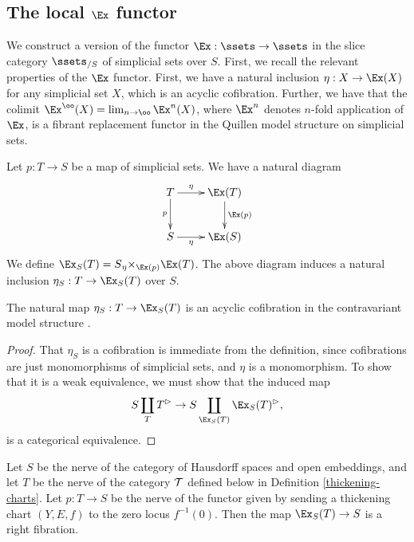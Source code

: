 \subsection{The local $\Ex$ functor}


We construct a version of the functor $\Ex: \ssets \to \ssets$ in the slice category $\ssets_{/S}$ of simplicial sets over $S$. First, we recall the relevant properties of the $\Ex$ functor. First, we have a natural inclusion $\eta: X \to \Ex(X)$ for any simplicial set $X$, which is an acyclic cofibration. Further, we have that the colimit $\Ex^\oo(X) = \lim_{n \to \oo} \Ex^n(X)$, where $\Ex^n$ denotes $n$-fold application of $\Ex$, is a fibrant replacement functor in the Quillen model structure on simplicial sets.

\begin{definition}\label{local-Ex}
Let $p: T \to S$ be a map of simplicial sets. We have a natural diagram
\[\xymatrix{
T \ar[r]^-{\eta} \ar[d]_-{p} & \Ex(T) \ar[d]^-{\Ex(p)} \\
S \ar[r]_-{\eta} & \Ex(S)
}\]
We define $\Ex_S(T) = S {}_{\eta}{\times}_{\Ex(p)} \Ex(T)$. The above diagram induces a natural inclusion $\eta_S:T \to \Ex_S(T)$ over $S$.
\end{definition}


\begin{prop}\label{local-Ex-weak-equivalence}
The natural map $\eta_S: T \to \Ex_S(T)$ is an acyclic cofibration in the contravariant model structure .
\end{prop}

\begin{proof}
That $\eta_S$ is a cofibration is immediate from the definition, since cofibrations are just monomorphisms of simplicial sets, and $\eta$ is a monomorphism. To show that it is a weak equivalence, we must show that the induced map
\[ S \coprod_T T^\rhd \to S \coprod_{\Ex_S(T)} \Ex_S(T)^\rhd, \]
is a categorical equivalence. 
\end{proof}

\begin{prop}\label{presheaf-of-implicit-structures}
 Let $S$ be the nerve of the category of Hausdorff spaces and open embeddings, and let $T$ be the nerve of the category $\mathcal T$ defined below in Definition \ref{thickening-charts}. Let $p: T \to S$ be the nerve of the functor given by sending a thickening chart $(Y, E, f)$ to the zero locus $f^{-1}(0)$. Then the map $\Ex_S(T) \to S$ is a right fibration.
\end{prop}

